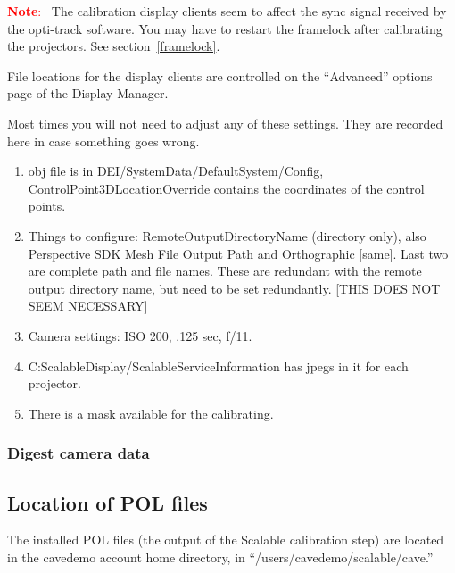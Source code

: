 \documentclass[11pt]{article}
\newenvironment{note}[1][Note]{\begin{lrbox}{\notebox}%
    \begin{minipage}{0.9\columnwidth}\textcolor{red}{\textbf{#1}:~}}%
    {\end{minipage}\end{lrbox}\begin{center}\setlength{\fboxsep}{8pt}%
    \fbox{\usebox{\notebox}}\end{center}}
\begin{document}
\begin{note}
  The calibration display clients seem to affect the sync signal
  received by the opti-track software.  You may have to restart the
  framelock after calibrating the projectors.  See
  section~\ref{framelock}.
\end{note}




File locations for the display clients are controlled on the
``Advanced'' options page of the Display Manager.

Most times you will not need to adjust any of these settings.  They
are recorded here in case something goes wrong.

\begin{enumerate}
\item obj file is in DEI/SystemData/DefaultSystem/Config,
  ControlPoint3DLocationOverride contains the coordinates of the
  control points.

\item Things to configure: RemoteOutputDirectoryName (directory only),
  also Perspective SDK Mesh File Output Path and Orthographic [same].
  Last two are complete path and file names.  These are redundant with
  the remote output directory name, but need to be set redundantly.
  [THIS DOES NOT SEEM NECESSARY]

\item Camera settings: ISO 200, .125 sec, f/11.

\item C:ScalableDisplay/ScalableServiceInformation has jpegs in it for
  each projector.

\item There is a mask available for the calibrating.
\end{enumerate}








\subsubsection{Digest camera data}

\subsection{Location of POL files}
\label{pol-location}

The installed POL files (the output of the Scalable calibration step)
are located in the cavedemo account home directory, in
``/users/cavedemo/scalable/cave.''
\end{document}
